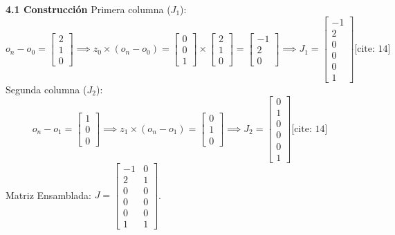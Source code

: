 \documentclass[11pt, a4paper]{article}
\begin{document}
\textbf{4.1 Construcción}
Primera columna ($J_1$):
\begin{equation*}
    o_n - o_0 = \begin{bmatrix} 2 \\ 1 \\ 0 \end{bmatrix} \implies z_0 \times (o_n - o_0) = \begin{bmatrix} 0 \\ 0 \\ 1 \end{bmatrix} \times \begin{bmatrix} 2 \\ 1 \\ 0 \end{bmatrix} = \begin{bmatrix} -1 \\ 2 \\ 0 \end{bmatrix} \implies J_1 = \boxed{ \begin{bmatrix} -1 \\ 2 \\ 0 \\ 0 \\ 0 \\ 1 \end{bmatrix} } \text{[cite: 14]}
\end{equation*}
Segunda columna ($J_2$):
\begin{equation*}
    o_n - o_1 = \begin{bmatrix} 1 \\ 0 \\ 0 \end{bmatrix} \implies z_1 \times (o_n - o_1) = \begin{bmatrix} 0 \\ 1 \\ 0 \end{bmatrix} \implies J_2 = \boxed{ \begin{bmatrix} 0 \\ 1 \\ 0 \\ 0 \\ 0 \\ 1 \end{bmatrix} } \text{[cite: 14]}
\end{equation*}
Matriz Ensamblada: $J = \boxed{ \begin{bmatrix} -1 & 0 \\ 2 & 1 \\ 0 & 0 \\ 0 & 0 \\ 0 & 0 \\ 1 & 1 \end{bmatrix} }$.
\end{document}
